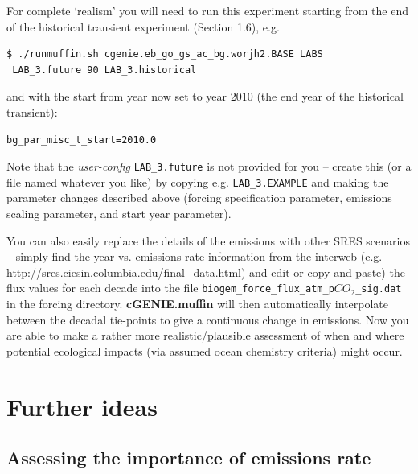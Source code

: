 \documentclass[11pt,fleqn]{book} %
\begin{document}
For complete ‘realism’ you will need to run this experiment starting from the end of the historical transient experiment (Section 1.6), e.g.
\vspace{-2pt}\begin{verbatim}
$ ./runmuffin.sh cgenie.eb_go_gs_ac_bg.worjh2.BASE LABS
 LAB_3.future 90 LAB_3.historical
\end{verbatim}\vspace{-2pt}
and with the start from year now set to year 2010 (the end year of the historical transient):
\vspace{-2pt}\begin{verbatim}
bg_par_misc_t_start=2010.0
\end{verbatim}\vspace{-2pt}
Note that the \textit{user-config} \texttt{LAB\_3.future} is not provided for you – create this (or a file named whatever you like) by copying e.g. \texttt{LAB\_3.EXAMPLE} and making the parameter changes described above (forcing specification parameter, emissions scaling parameter, and start year parameter).

You can also easily replace the details of the emissions with other SRES scenarios – simply find the year vs. emissions rate information from the interweb (e.g. http://sres.ciesin.columbia.edu/final\_data.html) and edit or copy-and-paste) the flux values for each decade into the file \texttt{biogem\_force\_flux\_atm\_p\(CO_{2}\)\_sig.dat} in the forcing directory.\textbf{ cGENIE.muffin} will then automatically interpolate between the decadal tie-points to give a continuous change in emissions. Now you are able to make a rather more realistic/plausible assessment of when and where potential ecological impacts (via assumed ocean chemistry criteria) might occur.


\newpage


\section{Further ideas}


\subsection{Assessing the importance of emissions rate}
\end{document}
